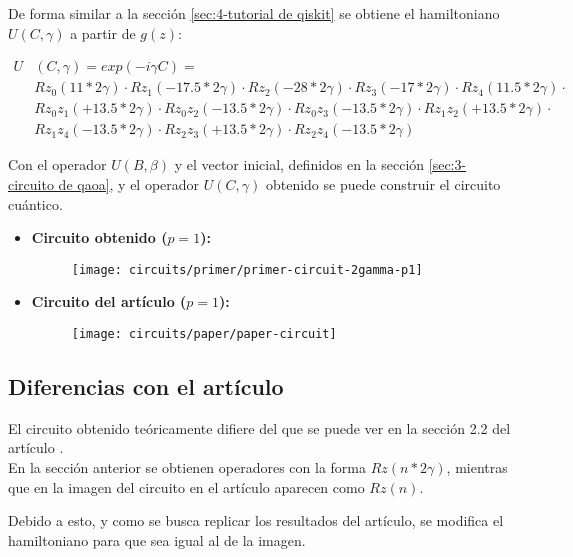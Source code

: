 \par
De forma similar a la sección \ref{sec:4-tutorial de qiskit} se obtiene el hamiltoniano $U(C, \gamma)$ a partir de $g(z)$:

\begin{align*}
  U&(C, \gamma) = exp(-i \gamma C) = &&\\
   &Rz_0(11*2\gamma) \cdot Rz_1(-17.5*2\gamma) \cdot Rz_2(-28*2\gamma) \cdot Rz_3(-17*2\gamma) \cdot Rz_4(11.5*2\gamma) \cdot \\
   &Rz_0z_1(+13.5 * 2\gamma) \cdot Rz_0z_2(-13.5 * 2\gamma) \cdot Rz_0z_3(-13.5 * 2\gamma) \cdot Rz_1z_2(+13.5 * 2\gamma) \cdot \\
   &Rz_1z_4(-13.5 * 2\gamma) \cdot Rz_2z_3(+13.5 * 2\gamma) \cdot Rz_2z_4(-13.5 * 2\gamma)
\end{align*}

Con el operador \(U(B, \beta)\) y el vector inicial, definidos en la sección \ref{sec:3-circuito de qaoa}, y el operador \(U(C, \gamma)\) obtenido se puede construir el circuito cuántico.

\begin{itemize}
\item \textbf{ Circuito obtenido ($p=1$): }

  \begin{figure}[htbp]{}{}
    \centering
    \texttt{[image: circuits/primer/primer-circuit-2gamma-p1]}
  \end{figure}


\item \textbf{Circuito del artículo ($p=1$):}

  \begin{figure}[htbp]{}{}
    \centering
    \texttt{[image: circuits/paper/paper-circuit]}
  \end{figure}
\end{itemize}

\subsection{Diferencias con el artículo}
El circuito obtenido teóricamente difiere del que se puede ver en la sección 2.2 del artículo \cite{multi-objective_routing_optimization}. \\
En la sección anterior se obtienen operadores con la forma \(Rz(n*2\gamma)\), mientras que en la imagen del circuito en el artículo aparecen como \(Rz(n)\).

Debido a esto, y como se busca replicar los resultados del artículo, se modifica el hamiltoniano para que sea igual al de la imagen.

